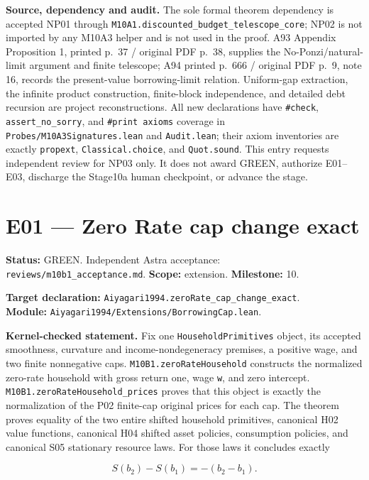 \documentclass[
  11pt,
]{article}
\let\LedgerOriginalTexttt\texttt
\renewcommand{\texttt}[1]{{\small\LedgerOriginalTexttt{#1}}}
\begin{document}
\textbf{Source, dependency and audit.} The sole formal theorem
dependency is accepted NP01 through
\texttt{M10A1.discounted\_budget\_telescope\_core}; NP02 is not imported
by any M10A3 helper and is not used in the proof. A93 Appendix
Proposition 1, printed p.~37 / original PDF p.~38, supplies the
No-Ponzi/natural-limit argument and finite telescope; A94 printed p.~666
/ original PDF p.~9, note 16, records the present-value borrowing-limit
relation. Uniform-gap extraction, the infinite product construction,
finite-block independence, and detailed debt recursion are project
reconstructions. All new declarations have \texttt{\#check},
\texttt{assert\_no\_sorry}, and \texttt{\#print\ axioms} coverage in
\texttt{Probes/M10A3Signatures.lean} and \texttt{Audit.lean}; their
axiom inventories are exactly \texttt{propext},
\texttt{Classical.choice}, and \texttt{Quot.sound}. This entry requests
independent review for NP03 only. It does not award GREEN, authorize
E01--E03, discharge the Stage10a human checkpoint, or advance the stage.

\section{E01 --- Zero Rate cap change
exact}\label{e01-zero-rate-cap-change-exact}

\textbf{Status:} GREEN. Independent Astra acceptance:
\texttt{reviews/m10b1\_acceptance.md}. \textbf{Scope:} extension.
\textbf{Milestone:} 10.

\textbf{Target declaration:}
\texttt{Aiyagari1994.zeroRate\_cap\_change\_exact}.\\
\textbf{Module:} \texttt{Aiyagari1994/Extensions/BorrowingCap.lean}.

\textbf{Kernel-checked statement.} Fix one \texttt{HouseholdPrimitives}
object, its accepted smoothness, curvature and income-nondegeneracy
premises, a positive wage, and two finite nonnegative caps.
\texttt{M10B1.zeroRateHousehold} constructs the normalized zero-rate
household with gross return one, wage \texttt{w}, and zero intercept.
\texttt{M10B1.zeroRateHousehold\_prices} proves that this object is
exactly the normalization of the P02 finite-cap original prices for each
cap. The theorem proves equality of the two entire shifted household
primitives, canonical H02 value functions, canonical H04 shifted asset
policies, consumption policies, and canonical S05 stationary resource
laws. For those laws it concludes exactly

\[
S(b_2)-S(b_1)=-(b_2-b_1).
\]
\end{document}
